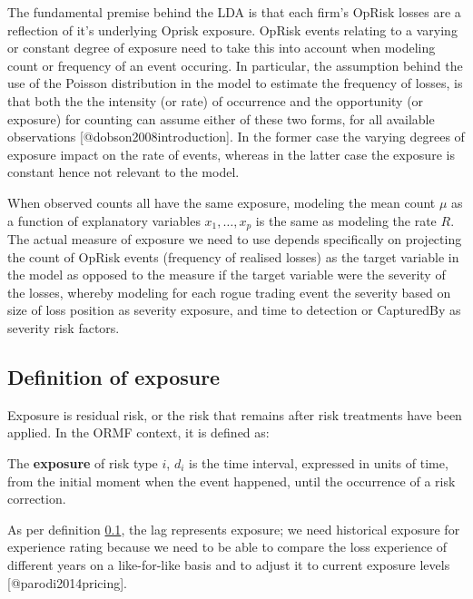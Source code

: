 \documentclass[]{article}
\begin{document}
The fundamental premise behind the LDA is that each firm's OpRisk losses
are a reflection of it's underlying Oprisk exposure. OpRisk events
relating to a varying or constant degree of exposure need to take this
into account when modeling count or frequency of an event occuring. In
particular, the assumption behind the use of the Poisson distribution in
the model to estimate the frequency of losses, is that both the the
intensity (or rate) of occurrence and the opportunity (or exposure) for
counting can assume either of these two forms, for all available
observations {[}@dobson2008introduction{]}. In the former case the
varying degrees of exposure impact on the rate of events, whereas in the
latter case the exposure is constant hence not relevant to the
model.\medskip

When observed counts all have the same exposure, modeling the mean count
\(\mu\) as a function of explanatory variables \(x_{1},\ldots,x_{p}\) is
the same as modeling the rate \(R\). The actual measure of exposure we
need to use depends specifically on projecting the count of OpRisk
events (frequency of realised losses) as the target variable in the
model as opposed to the measure if the target variable were the severity
of the losses, whereby modeling for each rogue trading event the
severity based on size of loss position as severity exposure, and time
to detection or CapturedBy as severity risk factors.

\subsection{Definition of exposure}
\label{ssec:Definition of exposure}

Exposure is residual risk, or the risk that remains after risk
treatments have been applied. In the ORMF context, it is defined as:

\begin{definition}
The  \textbf{exposure} of risk type $i$, $d_{i}$ is the time interval, expressed in units of time, from the initial moment when the event happened, until the occurrence of a risk correction.
\end{definition}

As per definition \ref{ssec:Definition of exposure}, the lag represents
exposure; we need historical exposure for experience rating because we
need to be able to compare the loss experience of different years on a
like-for-like basis and to adjust it to current exposure levels
{[}@parodi2014pricing{]}.
\end{document}
